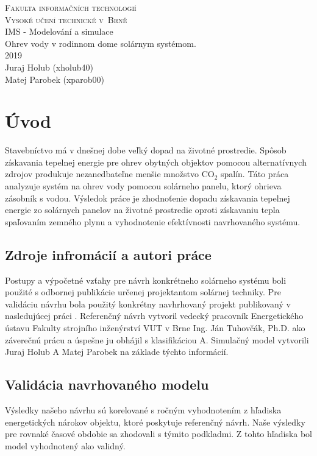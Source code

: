 \documentclass[a4paper, 11pt]{article}
\begin{document}
\begin{titlepage}
	\begin{center}
		\Huge
		\textsc{Fakulta informačních technologií \\
			Vysoké učení technické v~Brně} \\
		{\LARGE
			IMS - Modelování a simulace \\ 
			\medskip 
			\Large{
				Ohrev vody v rodinnom dome solárnym systémom.
			}
			}
		\setlength{\parindent}{0.3em}\\
		{\Large 2019} \\
		{\Large Juraj Holub (xholub40)}\\
		{\Large Matej Parobek (xparob00)}
	\end{center}
\end{titlepage}

\tableofcontents
\newpage

\section{Úvod}
Stavebníctvo má v dnešnej dobe veľký dopad na životné prostredie. Spôsob získavania tepelnej energie pre ohrev obytných objektov pomocou alternatívnych zdrojov produkuje nezanedbateľne menšie množstvo CO$_2$ spalín. Táto práca analyzuje systém na ohrev vody pomocou solárneho panelu, ktorý ohrieva zásobník s vodou. Výsledok práce je zhodnoťenie dopadu získavania tepelnej energie zo solárnych panelov na životné prostredie oproti získavaniu tepla spaľovaním zemného plynu a vyhodnotenie efektívnosti navrhovaného systému. 

\subsection{Zdroje infromácií a autori práce}
Postupy a výpočetné vzťahy pre návrh konkrétneho solárneho systému boli použité s odbornej publikácie \cite{Cihelka} určenej projektantom solárnej techniky. Pre validáciu návrhu bola použitý konkrétny navhrhovaný projekt publikovaný v nasledujúcej práci \cite{bc_solar_system}. Referenčný návrh vytvoril vedecký pracovník Energetického ústavu Fakulty strojního inženýrství VUT v Brne Ing. Ján Tuhovčák, Ph.D. ako záverečnú prácu a úspešne ju obhájil s klasifikáciou A. Simulačný model vytvorili Juraj Holub A Matej Parobek na základe týchto informácií. 

\subsection{Validácia navrhovaného modelu}
Výsledky našeho návrhu sú korelované s ročným vyhodnotením z hľadiska energetických nárokov objektu, ktoré poskytuje referenčný návrh. Naše výsledky pre rovnaké časové obdobie sa zhodovali s týmito podkladmi. Z tohto hľadiska bol model vyhodnotený ako validný.
\end{document}
